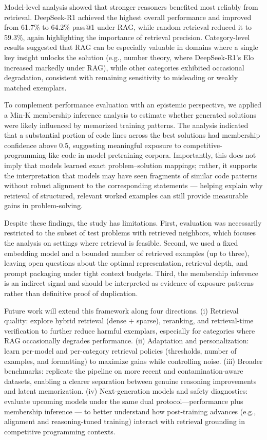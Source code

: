 \documentclass[preprint,12pt]{elsarticle}
\begin{document}
Model-level analysis showed that stronger reasoners benefited most reliably from retrieval. DeepSeek-R1 achieved the highest overall performance and improved from 61.7\% to 64.2\% pass@1 under RAG, while random retrieval reduced it to 59.3\%, again highlighting the importance of retrieval precision. Category-level results suggested that RAG can be especially valuable in domains where a single key insight unlocks the solution (e.g., number theory, where DeepSeek-R1’s Elo increased markedly under RAG), while other categories exhibited occasional degradation, consistent with remaining sensitivity to misleading or weakly matched exemplars. 

To complement performance evaluation with an epistemic perspective, we applied a Min-K membership inference analysis to estimate whether generated solutions were likely influenced by memorized training patterns. The analysis indicated that a substantial portion of code lines across the best solutions had membership confidence above 0.5, suggesting meaningful exposure to competitive-programming-like code in model pretraining corpora. Importantly, this does not imply that models learned exact problem–solution mappings; rather, it supports the interpretation that models may have seen fragments of similar code patterns without robust alignment to the corresponding statements — helping explain why retrieval of structured, relevant worked examples can still provide measurable gains in problem-solving. 

Despite these findings, the study has limitations. First, evaluation was necessarily restricted to the subset of test problems with retrieved neighbors, which focuses the analysis on settings where retrieval is feasible. Second, we used a fixed embedding model and a bounded number of retrieved examples (up to three), leaving open questions about the optimal representation, retrieval depth, and prompt packaging under tight context budgets. Third, the membership inference is an indirect signal and should be interpreted as evidence of exposure patterns rather than definitive proof of duplication.

Future work will extend this framework along four directions. (i) Retrieval quality: explore hybrid retrieval (dense + sparse), reranking, and retrieval-time verification to further reduce harmful exemplars, especially for categories where RAG occasionally degrades performance. (ii) Adaptation and personalization: learn per-model and per-category retrieval policies (thresholds, number of examples, and formatting) to maximize gains while controlling noise. (iii) Broader benchmarks: replicate the pipeline on more recent and contamination-aware datasets, enabling a clearer separation between genuine reasoning improvements and latent memorization. (iv) Next-generation models and safety diagnostics: evaluate upcoming models under the same dual protocol—performance plus membership inference — to better understand how post-training advances (e.g., alignment and reasoning-tuned training) interact with retrieval grounding in competitive programming contexts.
\end{document}

